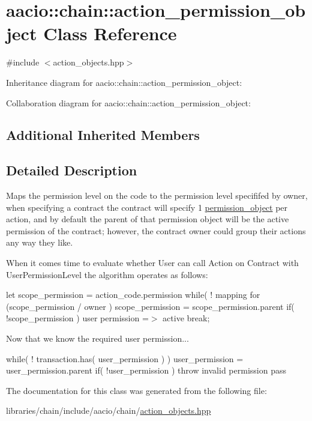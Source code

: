 \hypertarget{classaacio_1_1chain_1_1action__permission__object}{}\section{aacio\+:\+:chain\+:\+:action\+\_\+permission\+\_\+object Class Reference}
\label{classaacio_1_1chain_1_1action__permission__object}


{\ttfamily \#include $<$action\+\_\+objects.\+hpp$>$}



Inheritance diagram for aacio\+:\+:chain\+:\+:action\+\_\+permission\+\_\+object\+:


Collaboration diagram for aacio\+:\+:chain\+:\+:action\+\_\+permission\+\_\+object\+:
\subsection*{Additional Inherited Members}


\subsection{Detailed Description}
Maps the permission level on the code to the permission level specififed by owner, when specifying a contract the contract will specify 1 \mbox{\hyperlink{classaacio_1_1chain_1_1permission__object}{permission\+\_\+object}} per action, and by default the parent of that permission object will be the active permission of the contract; however, the contract owner could group their actions any way they like.

When it comes time to evaluate whether User can call Action on Contract with User\+Permission\+Level the algorithm operates as follows\+:

let scope\+\_\+permission = action\+\_\+code.\+permission while( ! mapping for (scope\+\_\+permission / owner ) scope\+\_\+permission = scope\+\_\+permission.\+parent if( !scope\+\_\+permission ) user permission =$>$ active break;

Now that we know the required user permission...

while( ! transaction.\+has( user\+\_\+permission ) ) user\+\_\+permission = user\+\_\+permission.\+parent if( !user\+\_\+permission ) throw invalid permission pass 

The documentation for this class was generated from the following file\+:\begin{DoxyCompactItemize}
\item 
libraries/chain/include/aacio/chain/\mbox{\hyperlink{action__objects_8hpp}{action\+\_\+objects.\+hpp}}\end{DoxyCompactItemize}
